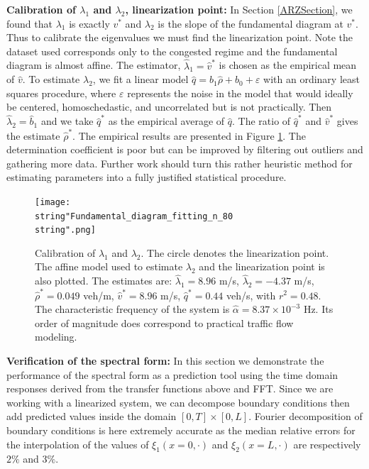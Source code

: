 \documentclass[letterpaper, 10 pt, conference]{ieeeconf}  %
\begin{document}
\textbf{Calibration of $\lambda_{1}$ and $\lambda_{2}$, linearization point:}
In Section \ref{ARZSection}, we found that $\lambda_{1}$ is exactly $v^*$ and $\lambda_{2}$ is the slope of the fundamental diagram at $v^*$. Thus to calibrate the eigenvalues we must find the linearization point. Note the dataset used corresponds only to the congested regime and the fundamental diagram is almost affine. The estimator, $\widehat{\lambda}_1=\widehat{v}^*$ is chosen as the empirical mean of $\widehat{v}$. To estimate $\lambda_{2}$, we fit a linear model $\widehat{q}=b_{1}\widehat{\rho}+b_{0}+\varepsilon$ with an ordinary least squares procedure, where $\varepsilon$
represents the noise in the model that would ideally be centered,
homoschedastic, and uncorrelated but is not practically. Then $\widehat{\lambda}_{2}=\widehat{b}_{1}$ and we take $\widehat{q}^*$ as the empirical average of $\widehat{q}$. The ratio of $\widehat{q}^*$ and $\widehat{v}^*$ gives the estimate $\widehat{\rho}^*$.
The empirical results are presented in Figure \ref{fig:Calibration-of-eigen-values}. The determination coefficient is poor but can be improved by filtering out outliers and gathering more data. Further work should turn this rather heuristic method for estimating parameters into a fully justified statistical procedure.

\begin{figure}[H]
\centering
\texttt{[image: \\string"Fundamental\_diagram\_fitting\_n\_80\\string".png]}
\protect\caption{Calibration of $\lambda_{1}$ and $\lambda_{2}$. The circle denotes the linearization point. The affine model used to estimate $\lambda_{2}$ and the linearization point is also plotted. The estimates are: $\widehat{\lambda}_{1}=8.96$ m/s, $\widehat{\lambda}_{2}=-4.37$ m/s, $\widehat{\rho}^{*}=0.049$ veh/m, $\widehat{v}^{*}=8.96$ m/s, $\widehat{q}^{*}=0.44$ veh/s, with $r^{2}=0.48$. The characteristic frequency of the system is $\widehat{\alpha} = 8.37\times10^{-3}$ Hz. Its order of magnitude does correspond to practical traffic flow modeling.}
\label{fig:Calibration-of-eigen-values}
\end{figure}

\textbf{Verification of the spectral form:}
In this section we demonstrate the performance of the spectral form as a prediction tool using the time domain responses derived from the transfer functions above and FFT. Since we are working with a linearized system, we can decompose boundary conditions then add predicted values inside the domain $\left[0,T\right]\times\left[0,L\right]$. Fourier decomposition of boundary conditions is here extremely accurate as the median relative errors for the interpolation of the values of $\xi_{1}\left(x=0, \cdot \right)$ and $\xi_{2}\left(x=L, \cdot \right)$ are respectively $2\%$ and $3\%$.
\end{document}
